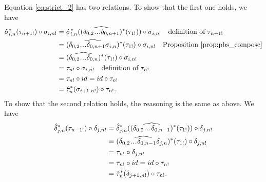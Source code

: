 Equation \ref{eq:strict_2} has two relations. 
To show that the first one holds, we have
\begin{align*}
\hat{\sigma}_{i,n}^*(\tau_{n+1!}) \circ \sigma_{i,n!} 
&= 
\hat{\sigma}_{i,n}^*(
  (\widehat{\delta_{0,2}\smdots\delta_{0,n+1}})^*
  (\tau_{1!})) \circ \sigma_{i,n!}
  \quad \textrm{definition of }\tau_{n+1!}\\
&= 
(\widehat{\delta_{0,2}\smdots\delta_{0,n+1}\sigma_{i,n}})^*
  (\tau_{1!}) \circ \sigma_{i,n!}
  \quad \textrm{Proposition } \ref{prop:pbs_compose}\\
&= 
(\widehat{\delta_{0,2}\smdots\delta_{0,n}})^*
  (\tau_{1!}) \circ \sigma_{i,n!}\\
&= 
\tau_{n!} \circ \sigma_{i,n!}
  \quad \textrm{definition of }\tau_{n!}\\
&= 
\tau_{n!} \circ id  
  = id \circ \tau_{n!} \\
&= 
\hat{\tau}_n^*(\sigma_{i+1,n!}) \circ \tau_{n!}.
\end{align*}
To show that the second relation holds, the 
reasoning is the same as above. We have
\begin{align*}
\hat{\delta}_{j,n}^*(\tau_{n-1!}) \circ \delta_{j,n!} 
&= 
\hat{\delta}_{j,n}^*
  ((\widehat{\delta_{0,2}\smdots\delta_{0,n-1}})^*
  (\tau_{1!})) \circ \delta_{j,n!} \\
&=
(\widehat{\delta_{0,2}\smdots\delta_{0,n-1}\delta_{j,n}})^*
  (\tau_{1!}) \circ \delta_{j,n!} \\
&=
\tau_{n!} \circ \delta_{j,n!}\\
&= 
\tau_{n!} \circ id   
  = id \circ \tau_{n!}\\
&=
\hat{\tau}_n^*(\delta_{j+1,n!}) \circ \tau_{n!}. 
\end{align*} 


